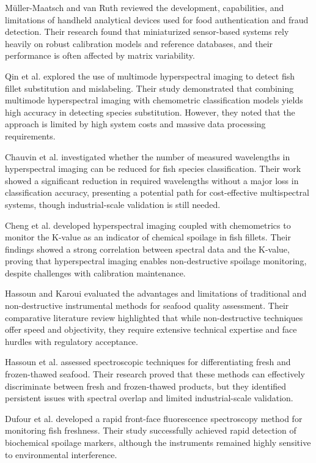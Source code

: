 \documentclass[conference]{IEEEtran}
\begin{document}
M{\"u}ller-Maatsch and van Ruth \cite{ref2} reviewed the development, capabilities, and limitations of handheld analytical devices used for food authentication and fraud detection. Their research found that miniaturized sensor-based systems rely heavily on robust calibration models and reference databases, and their performance is often affected by matrix variability.

Qin et al. \cite{ref3} explored the use of multimode hyperspectral imaging to detect fish fillet substitution and mislabeling. Their study demonstrated that combining multimode hyperspectral imaging with chemometric classification models yields high accuracy in detecting species substitution. However, they noted that the approach is limited by high system costs and massive data processing requirements.

Chauvin et al. \cite{ref4} investigated whether the number of measured wavelengths in hyperspectral imaging can be reduced for fish species classification. Their work showed a significant reduction in required wavelengths without a major loss in classification accuracy, presenting a potential path for cost-effective multispectral systems, though industrial-scale validation is still needed.

Cheng et al. \cite{ref5} developed hyperspectral imaging coupled with chemometrics to monitor the K-value as an indicator of chemical spoilage in fish fillets. Their findings showed a strong correlation between spectral data and the K-value, proving that hyperspectral imaging enables non-destructive spoilage monitoring, despite challenges with calibration maintenance.

Hassoun and Karoui \cite{ref6} evaluated the advantages and limitations of traditional and non-destructive instrumental methods for seafood quality assessment. Their comparative literature review highlighted that while non-destructive techniques offer speed and objectivity, they require extensive technical expertise and face hurdles with regulatory acceptance.

Hassoun et al. \cite{ref7} assessed spectroscopic techniques for differentiating fresh and frozen-thawed seafood. Their research proved that these methods can effectively discriminate between fresh and frozen-thawed products, but they identified persistent issues with spectral overlap and limited industrial-scale validation.

Dufour et al. \cite{ref8} developed a rapid front-face fluorescence spectroscopy method for monitoring fish freshness. Their study successfully achieved rapid detection of biochemical spoilage markers, although the instruments remained highly sensitive to environmental interference.
\end{document}
